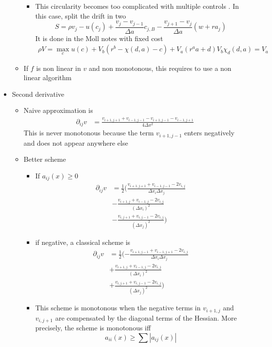 \documentclass[english]{article}
\begin{document}
\begin{itemize}
\begin{itemize}
\begin{itemize}
			\item This circularity becomes too complicated with multiple controls . In this case, split the drift in two
			$$S = \rho v_j - u(c_j) + \frac{v_j-v_{j-1}}{\Delta a} c_{j, B} - \frac{v_{j+1}-v_j}{\Delta a} (w + ra_j)$$
			It is done in the Moll notes with fixed cost
			\begin{align*}
				\rho V =\max_c u(c) + V_b(r^b-\chi(d, a) - c) + V_a(r^a a + d)
				V_b \chi_d(d, a) = V_a
			\end{align*}
		\end{itemize}
		\item If $f$ is non linear in $v$ and non monotonous, this requires to use a non linear algorithm
	\end{itemize}
	\item Second derivative
	\begin{itemize}
		\item Naive approximation is
		\begin{align*}
			\partial_{ij}v&=\frac{v_{i+1, j+1} + v_{i-1, j-1} - v_{i+1, j-1} - v_{i-1, j+1}}{4\Delta x^2}
		\end{align*}
		This is never monotonous because the term $v_{i+1, j-1}$ enters negatively and does not appear anywhere else
		\item Better scheme
		\begin{itemize}
			\item If $a_{ij}(x) \geq 0$
			\begin{align*}
				\partial_{ij}v&= \frac{1}{2}(\frac{v_{i+1, j+1} + v_{i-1, j-1}- 2v_{i,j}}{\Delta x_i \Delta x_j} \\
				&-  \frac{v_{i+1, j} + v_{i-1, j}- 2v_{i,j}}{(\Delta x_i)^2}\\
				&-  \frac{v_{i, j+1} + v_{i, j-1}- 2v_{i,j}}{(\Delta x_j)^2})
			\end{align*}
			\item if negative, a classical scheme is
			\begin{align*}
				\partial_{ij}v&= \frac{1}{2}(-\frac{v_{i+1, j-1} + v_{i-1, j+1}- 2v_{i,j}}{\Delta x_i \Delta x_j} \\
				&+  \frac{v_{i+1, j} + v_{i-1, j}- 2v_{i,j}}{(\Delta x_i)^2}\\
				&+  \frac{v_{i, j+1} + v_{i, j-1}- 2v_{i,j}}{(\Delta x_j)^2})
			\end{align*}
			\item This scheme is monotonous when the negative terms in $v_{i+1, j}$ and $v_{i, j+1}$ are compensated by the diagonal terms of the Hessian. More precisely, the scheme is monotonous iff 		$$a_{ii}(x) \geq \sum |a_{ij}(x)|$$

\end{itemize}
\end{itemize}
\end{itemize}
\end{document}
